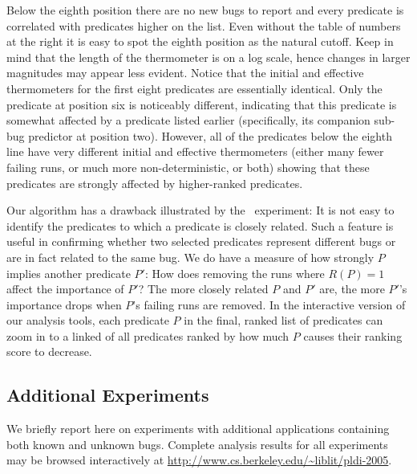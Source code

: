 Below the eighth position there are no new bugs to report and every
predicate is correlated with predicates higher on the list.  Even
without the table of numbers at the right it is easy to spot the
eighth position as the natural cutoff.  Keep in mind that the length
of the thermometer is on a log scale, hence changes in larger
magnitudes may appear less evident.  Notice that the initial and
effective thermometers for the first eight predicates are essentially
identical.  Only the predicate at position six is noticeably
different, indicating that this predicate is somewhat affected by a
predicate listed earlier (specifically, its companion sub-bug
predictor at position two).  However, all of the predicates below the
eighth line have very different initial and effective thermometers
(either many fewer failing runs, or much more non-deterministic, or
both) showing that these predicates are strongly affected by
higher-ranked predicates.

Our algorithm has a drawback illustrated by the \moss\ experiment: It
is not easy to identify the predicates to which a predicate is closely
related.  Such a feature is useful in confirming whether two selected
predicates represent different bugs or are in fact related to the same
bug.  We do have a measure of how strongly $P$ implies another
predicate $P'$: How does removing the runs where $R(P) = 1$ affect the
importance of $P'$?  The more closely related $P$ and $P'$ are, the
more $P'$'s importance drops when $P$'s failing runs are removed.  In
the interactive version of our analysis tools, each predicate $P$ in
the final, ranked list of predicates can zoom in to a linked
 of all predicates ranked by how much $P$
causes their ranking score to decrease.

\subsection{Additional Experiments}

We briefly report here on experiments with additional applications
containing both known and unknown bugs.  Complete analysis results for
all experiments may be browsed interactively at
\url{http://www.cs.berkeley.edu/~liblit/pldi-2005}.

\subsubsection{\ccrypt}


